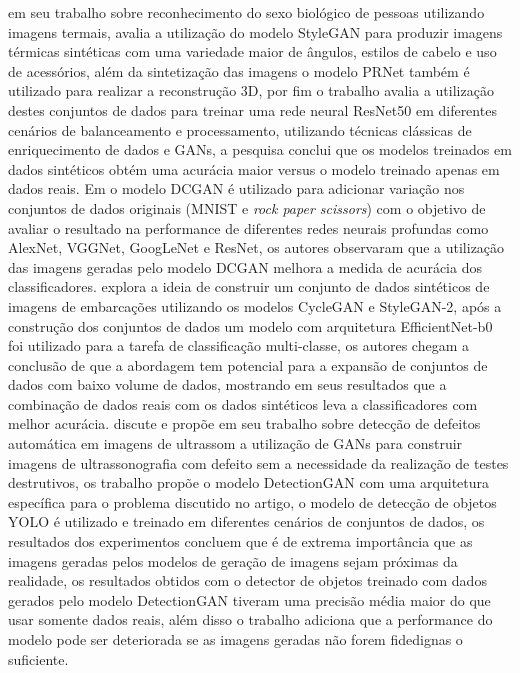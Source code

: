  em seu trabalho sobre reconhecimento do sexo biológico de pessoas utilizando imagens termais, avalia a utilização do modelo StyleGAN para produzir imagens térmicas sintéticas com uma variedade maior de ângulos, estilos de cabelo e uso de acessórios, além da sintetização das imagens o modelo PRNet também é utilizado para realizar a reconstrução 3D, por fim o trabalho avalia a utilização destes conjuntos de dados para treinar uma rede neural ResNet50 em diferentes cenários de balanceamento e processamento, utilizando técnicas clássicas de enriquecimento de dados e GANs, a pesquisa conclui que os modelos treinados em dados sintéticos obtém uma acurácia maior versus o modelo treinado apenas em dados reais.
Em  o modelo DCGAN é utilizado para adicionar variação nos conjuntos de dados originais (MNIST e \textit{rock paper scissors}) com o objetivo de avaliar o resultado na performance de diferentes redes neurais profundas como AlexNet, VGGNet, GoogLeNet e ResNet, os autores observaram que a utilização das imagens geradas pelo modelo DCGAN melhora a medida de acurácia dos classificadores.
 explora a ideia de construir um conjunto de dados sintéticos de imagens de embarcações utilizando os modelos CycleGAN e StyleGAN-2, após a construção dos conjuntos de dados um modelo com arquitetura EfficientNet-b0 foi utilizado para a tarefa de classificação multi-classe, os autores chegam a conclusão de que a abordagem tem potencial para a expansão de conjuntos de dados com baixo volume de dados, mostrando em seus resultados que a combinação de dados reais com os dados sintéticos leva a classificadores com melhor acurácia.
 discute e propõe em seu trabalho sobre detecção de defeitos automática em imagens de ultrassom a utilização de GANs para construir imagens de ultrassonografia com defeito sem a necessidade da realização de testes destrutivos, os trabalho propõe o modelo DetectionGAN com uma arquitetura específica para o problema discutido no artigo, o modelo de detecção de objetos YOLO é utilizado e treinado em diferentes cenários de conjuntos de dados, os resultados dos experimentos concluem que é de extrema importância que as imagens geradas pelos modelos de geração de imagens sejam próximas da realidade, os resultados obtidos com o detector de objetos treinado com dados gerados pelo modelo DetectionGAN tiveram uma precisão média maior do que usar somente dados reais, além disso o trabalho adiciona que a performance do modelo pode ser deteriorada se as imagens geradas não forem fidedignas o suficiente.
